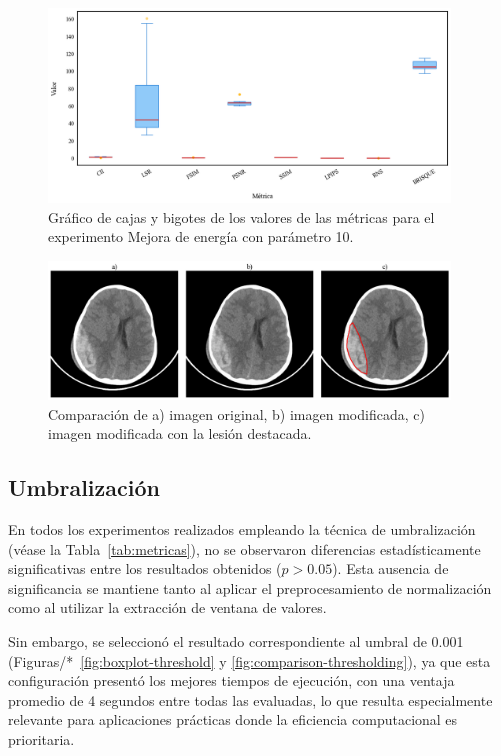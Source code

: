 \begin{figure}[H]
    \centering
    \includegraphics[width=0.95\textwidth]{Graphics/boxplot-enhancement.png}
    \caption{Gráfico de cajas y bigotes de los valores de las métricas para el experimento Mejora de energía con parámetro 10.}
    \label{fig:boxplot-enhancement}
\end{figure}

\begin{figure}[H]
    \centering
    \includegraphics[width=0.95\textwidth]{Graphics/comparison-enhancement.png}
    \caption{Comparación de a) imagen original, b) imagen modificada, c) imagen modificada con la lesión destacada.}
    \label{fig:comparison-enhancement}
\end{figure}

\subsection{Umbralización}

En todos los experimentos realizados empleando la técnica de umbralización (véase la Tabla~\ref{tab:metricas}), no se observaron diferencias estadísticamente significativas entre los resultados obtenidos ($p > 0.05$). Esta ausencia de significancia se mantiene tanto al aplicar el preprocesamiento de normalización como al utilizar la extracción de ventana de valores.

Sin embargo, se seleccionó el resultado correspondiente al umbral de 0.001 (Figuras/*~\ref{fig:boxplot-threshold} y \ref{fig:comparison-thresholding}), ya que esta configuración presentó los mejores tiempos de ejecución, con una ventaja promedio de 4 segundos entre todas las evaluadas, lo que resulta especialmente relevante para aplicaciones prácticas donde la eficiencia computacional es prioritaria.

